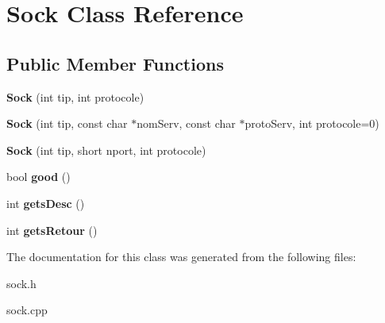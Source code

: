 \hypertarget{class_sock}{\section{\-Sock \-Class \-Reference}
\label{class_sock}
}
\subsection*{\-Public \-Member \-Functions}
\begin{DoxyCompactItemize}
\item 
\hypertarget{class_sock_a88c9112bb9779f1eac3c119dd988ea1a}{{\bfseries \-Sock} (int tip, int protocole)}\label{class_sock_a88c9112bb9779f1eac3c119dd988ea1a}

\item 
\hypertarget{class_sock_ac5a7483c57b83f543ffe6e9597f71de0}{{\bfseries \-Sock} (int tip, const char $\ast$nom\-Serv, const char $\ast$proto\-Serv, int protocole=0)}\label{class_sock_ac5a7483c57b83f543ffe6e9597f71de0}

\item 
\hypertarget{class_sock_ae3048545d248c024a3e4c47304e6275b}{{\bfseries \-Sock} (int tip, short nport, int protocole)}\label{class_sock_ae3048545d248c024a3e4c47304e6275b}

\item 
\hypertarget{class_sock_a7663f862e18f61152bda5323006c581e}{bool {\bfseries good} ()}\label{class_sock_a7663f862e18f61152bda5323006c581e}

\item 
\hypertarget{class_sock_a3e90d180f9a6e1fee08de1c51d8575a6}{int {\bfseries gets\-Desc} ()}\label{class_sock_a3e90d180f9a6e1fee08de1c51d8575a6}

\item 
\hypertarget{class_sock_ae741cb4ee4feb54af9775e7579dcc615}{int {\bfseries gets\-Retour} ()}\label{class_sock_ae741cb4ee4feb54af9775e7579dcc615}

\end{DoxyCompactItemize}


\-The documentation for this class was generated from the following files\-:\begin{DoxyCompactItemize}
\item 
sock.\-h\item 
sock.\-cpp\end{DoxyCompactItemize}
